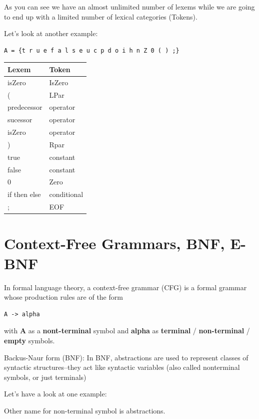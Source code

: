 \documentclass[11pt]{article}
\begin{document}
As you can see we have an almost unlimited number of lexems while we are going to end
up with a limited number of lexical categories (Tokens).


Let's look at another example:

\begin{verbatim}
A = {t r u e f a l s e u c p d o i h n Z 0 ( ) ;}
\end{verbatim}

\begin{center}
\begin{tabular}{ll}
\hline
Lexem & Token\\
\hline
isZero & IsZero\\
\hline
( & LPar\\
\hline
predecessor & operator\\
\hline
sucessor & operator\\
\hline
isZero & operator\\
\hline
) & Rpar\\
\hline
true & constant\\
\hline
false & constant\\
\hline
0 & Zero\\
\hline
if then else & conditional\\
\hline
; & EOF\\
\hline
\end{tabular}
\end{center}

\section{Context-Free Grammars, BNF, E-BNF}
\label{sec:org155572f}


In formal language theory, a context-free grammar (CFG) is a formal grammar
whose production rules are of the form

\begin{verbatim}
A -> alpha
\end{verbatim}

with \textbf{A} as a \textbf{nont-terminal} symbol and \textbf{alpha} as \textbf{terminal} / \textbf{non-terminal}
/ \textbf{empty} symbols.

Backus-Naur form (BNF): In BNF, abstractions are used to represent classes of
syntactic structures--they act like syntactic variables (also called nonterminal
symbols, or just terminals)


Let's have a look at one example:

Other name for non-terminal symbol is abstractions.
\end{document}
